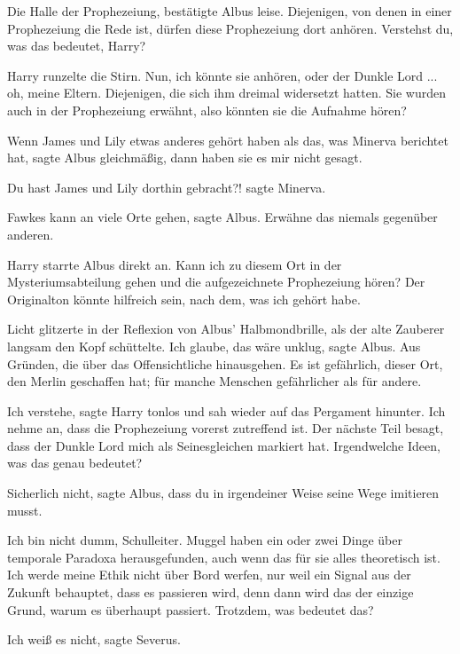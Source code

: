 \glqq{}Die Halle der Prophezeiung\grqq{}, bestätigte Albus leise. \glqq{}
Diejenigen, von denen in einer Prophezeiung die Rede ist, dürfen diese
Prophezeiung dort anhören. Verstehst du, was das bedeutet, Harry?\grqq{}

Harry runzelte die Stirn. \glqq{}Nun, ich könnte sie anhören, oder der Dunkle
Lord ... oh, meine Eltern. Diejenigen, die sich ihm dreimal widersetzt hatten.
Sie wurden auch in der Prophezeiung erwähnt, also könnten sie die Aufnahme
hören?\grqq{}

\glqq{}Wenn James und Lily etwas anderes gehört haben als das, was Minerva
berichtet hat\grqq{}, sagte Albus gleichmäßig, \glqq{}dann haben sie es mir nicht
gesagt.\grqq{}

\glqq{}Du hast James und Lily dorthin gebracht?!\grqq{} sagte Minerva.

\glqq{}Fawkes kann an viele Orte gehen\grqq{}, sagte Albus. \glqq{}Erwähne das
niemals gegenüber anderen.\grqq{}

Harry starrte Albus direkt an. \glqq{}Kann ich zu diesem Ort in der
Mysteriumsabteilung gehen und die aufgezeichnete Prophezeiung hören? Der
Originalton könnte hilfreich sein, nach dem, was ich gehört habe.\grqq{}

Licht glitzerte in der Reflexion von Albus' Halbmondbrille, als der alte
Zauberer langsam den Kopf schüttelte. \glqq{}Ich glaube, das wäre unklug\grqq{},
sagte Albus. \glqq{}Aus Gründen, die über das Offensichtliche hinausgehen. Es ist
gefährlich, dieser Ort, den Merlin geschaffen hat; für manche Menschen
gefährlicher als für andere.\grqq{}

\glqq{}Ich verstehe\grqq{}, sagte Harry tonlos und sah wieder auf das Pergament
hinunter. \glqq{}Ich nehme an, dass die Prophezeiung vorerst zutreffend ist. Der
nächste Teil besagt, dass der Dunkle Lord mich als Seinesgleichen markiert hat.
Irgendwelche Ideen, was das genau bedeutet?\grqq{}

\glqq{}Sicherlich nicht\grqq{}, sagte Albus, \glqq{}dass du in irgendeiner Weise
seine Wege imitieren musst.\grqq{}

\glqq{}Ich bin nicht dumm, Schulleiter. Muggel haben ein oder zwei Dinge über
temporale Paradoxa herausgefunden, auch wenn das für sie alles theoretisch ist.
Ich werde meine Ethik nicht über Bord werfen, nur weil ein Signal aus der
Zukunft behauptet, dass es passieren wird, denn dann wird das der einzige Grund,
warum es überhaupt passiert. Trotzdem, was bedeutet das?\grqq{}

\glqq{}Ich weiß es nicht\grqq{}, sagte Severus.

